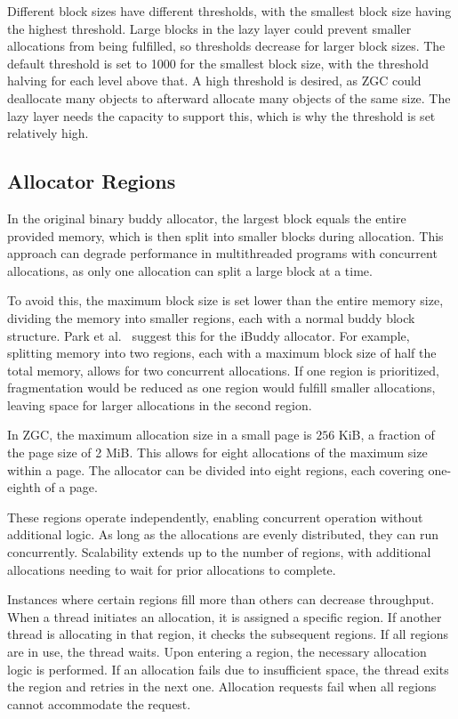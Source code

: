 \newpage
Different block sizes have different thresholds, with the smallest block size having the highest threshold. Large blocks in the lazy layer could prevent smaller allocations from being fulfilled, so thresholds decrease for larger block sizes. The default threshold is set to 1000 for the smallest block size, with the threshold halving for each level above that. A high threshold is desired, as ZGC could deallocate many objects to afterward allocate many objects of the same size. The lazy layer needs the capacity to support this, which is why the threshold is set relatively high.

\subsection{Allocator Regions} \label{sec:concurrencyexpl}
In the original binary buddy allocator, the largest block equals the entire provided memory, which is then split into smaller blocks during allocation. This approach can degrade performance in multithreaded programs with concurrent allocations, as only one allocation can split a large block at a time.

To avoid this, the maximum block size is set lower than the entire memory size, dividing the memory into smaller regions, each with a normal buddy block structure. Park et al.~\cite{park2014ibuddy} suggest this for the iBuddy allocator. For example, splitting memory into two regions, each with a maximum block size of half the total memory, allows for two concurrent allocations. If one region is prioritized, fragmentation would be reduced as one region would fulfill smaller allocations, leaving space for larger allocations in the second region.

In ZGC, the maximum allocation size in a small page is $256$ KiB, a fraction of the page size of 2 MiB. This allows for eight allocations of the maximum size within a page. The allocator can be divided into eight regions, each covering one-eighth of a page.

These regions operate independently, enabling concurrent operation without additional logic. As long as the allocations are evenly distributed, they can run concurrently. Scalability extends up to the number of regions, with additional allocations needing to wait for prior allocations to complete.

Instances where certain regions fill more than others can decrease throughput. When a thread initiates an allocation, it is assigned a specific region. If another thread is allocating in that region, it checks the subsequent regions. If all regions are in use, the thread waits. Upon entering a region, the necessary allocation logic is performed. If an allocation fails due to insufficient space, the thread exits the region and retries in the next one. Allocation requests fail when all regions cannot accommodate the request.

